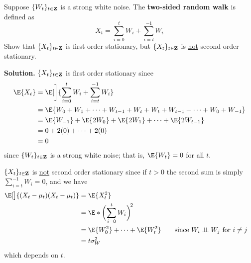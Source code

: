 \begin{Exercise}{}{}
    Suppose $ \{W_t\}_{t\in\mathbf{Z}} $ is a strong white noise.
    The \textbf{two-sided random walk} is defined as
    \[ X_t=\sum_{i=0}^{t} W_i+\sum_{i=t}^{-1} W_i  \]
    Show that $ \{X_t\}_{t\in\mathbf{Z}} $ is first order stationary,
    but $ \{X_t\}_{t\in\mathbf{Z}} $ is \underline{not} second order stationary.

    \textbf{Solution.} $ \{X_t\}_{t\in\mathbf{Z}} $ is first order stationary
    since
    \begin{align*}
        \E{X_t}
         & =\E[\bigg]{\sum_{i=0}^{t}W_i+\sum_{i=t}^{-1} W_i}                   \\
         & =\E{W_0+W_1+\cdots+W_{t-1}+W_{t}+W_{t}+W_{t-1}+\cdots+W_{0}+W_{-1}} \\
         & =\E{W_{-1}}+\E{2W_0}+\E{2W_1}+\cdots+\E{2W_{t-1}}                   \\
         & =0+2(0)+\cdots+2(0)                                                 \\
         & =0
    \end{align*}
    since $ \{W_t\}_{t\in\mathbf{Z}} $ is a strong white noise; that is,
    $ \E{W_t}=0 $ for all $ t $.

    $ \{X_t\}_{t\in\mathbf{Z}} $ is \underline{not} second order stationary
    since if $ t>0 $ the second sum is simply $ \sum_{i=t}^{-1} W_i=0 $, and we have
    \begin{align*}
        \E[\big]{(X_t-\mu_t)(X_t-\mu_t)}
         & =\E{X_t^2}                                                                                           \\
         & =\E*{\biggl(\sum_{i=0}^{t} W_i\biggr)^{\!2}}                                                         \\
         & =\E{W_0^2}+\cdots+\E{W_t^2}                  & \quad & \text{since $ W_i\indep W_j $ for $ i\ne j $} \\
         & =t\sigma_W^2
    \end{align*}
    which depends on $ t $.
\end{Exercise}
